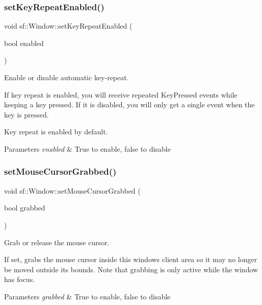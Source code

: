\subsubsection{\texorpdfstring{set\+Key\+Repeat\+Enabled()}{setKeyRepeatEnabled()}}
{\footnotesize\ttfamily void sf\+::\+Window\+::set\+Key\+Repeat\+Enabled (\begin{DoxyParamCaption}\item[{bool}]{enabled }\end{DoxyParamCaption})}



Enable or disable automatic key-\/repeat. 

If key repeat is enabled, you will receive repeated Key\+Pressed events while keeping a key pressed. If it is disabled, you will only get a single event when the key is pressed.

Key repeat is enabled by default.


\begin{DoxyParams}{Parameters}
{\em enabled} & True to enable, false to disable \\
\hline
\end{DoxyParams}
\mbox{\label{classsf_1_1_window_a5b4ef8ede77531e17b7a0287fa6ff9ce}} 
\subsubsection{\texorpdfstring{set\+Mouse\+Cursor\+Grabbed()}{setMouseCursorGrabbed()}}
{\footnotesize\ttfamily void sf\+::\+Window\+::set\+Mouse\+Cursor\+Grabbed (\begin{DoxyParamCaption}\item[{bool}]{grabbed }\end{DoxyParamCaption})}



Grab or release the mouse cursor. 

If set, grabs the mouse cursor inside this window\textquotesingle{}s client area so it may no longer be moved outside its bounds. Note that grabbing is only active while the window has focus.


\begin{DoxyParams}{Parameters}
{\em grabbed} & True to enable, false to disable \\
\hline
\end{DoxyParams}
\mbox{\label{classsf_1_1_window_aad3991c25e0a83afbb4d62febf9b7b14}} 
